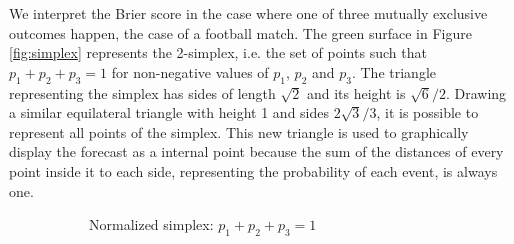 \documentclass[journal,article,accept,moreauthors,pdftex,12pt,a4paper]{mdpi}
\begin{document}
    We interpret the Brier score in the case where one of three mutually exclusive outcomes happen, the case of a football match.
    The green surface in Figure \ref{fig:simplex} represents the 2-simplex, i.e. the set of points such that $p_1+p_2+p_3=1$ for non-negative values of $p_1$, $p_2$ and $p_3$.
    The triangle representing the simplex has sides of length $\sqrt{2}$ and its height is $\sqrt{6}/2$.
    Drawing a similar equilateral triangle with height 1 and sides $2\sqrt{3}/3$, it is possible to represent all points of the simplex.
    This new triangle is used to graphically display the forecast as a internal point because the sum of the distances of every point inside it to each side, representing the probability of each event, is always one.

    \begin{figure}[!ht]
        \centering
        \begin{subfigure}[b]{0.48\linewidth}        %
            \centering



            \caption{Normalized simplex: $p_1+p_2+p_3=1$}
            \label{fig:A}
        \end{subfigure}
        \begin{subfigure}[b]{0.48\linewidth}        %
            \centering


\end{subfigure}
\end{figure}
\end{document}
